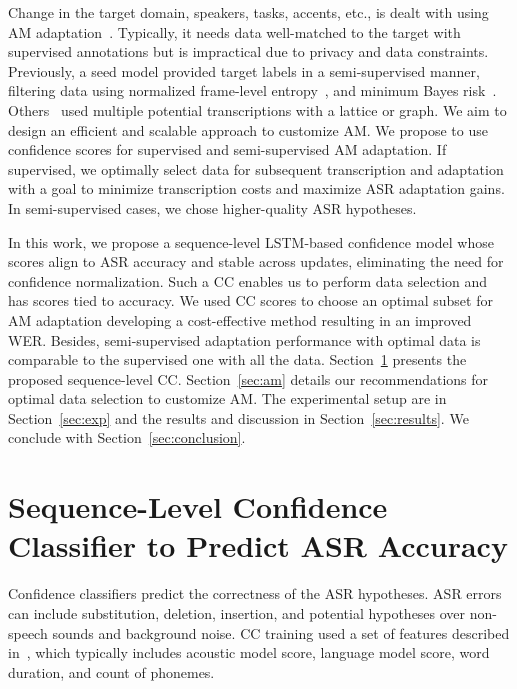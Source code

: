 \documentclass[a4paper]{article}
\begin{document}
Change in the target domain, speakers, tasks, accents, etc., is dealt with using AM adaptation~\cite{Bell2020}. Typically, it needs data well-matched to the target with supervised annotations but is impractical due to privacy and data constraints. Previously, a seed model provided target labels in a semi-supervised manner, filtering data using normalized frame-level entropy~\cite{Liu2007}, and minimum Bayes risk~\cite{Walker2017}. Others~\cite{Manohar2018, Klejch2019} used multiple potential transcriptions with a lattice or graph. We aim to design an efficient and scalable approach to customize AM. We propose to use confidence scores for supervised and semi-supervised AM adaptation. If supervised, we optimally select data for subsequent transcription and adaptation with a goal to minimize transcription costs and maximize ASR adaptation gains. In semi-supervised cases, we chose higher-quality ASR hypotheses.

In this work, we propose a sequence-level LSTM-based confidence model whose scores align to ASR accuracy and stable across updates, eliminating the need for confidence normalization. Such a CC enables us to perform data selection and has scores tied to accuracy. We used CC scores to choose an optimal subset for AM adaptation developing a cost-effective method resulting in an improved WER. Besides, semi-supervised adaptation performance with optimal data is comparable to the supervised one with all the data. Section~\ref{sec:cc} presents the proposed sequence-level CC. Section~\ref{sec:am} details our recommendations for optimal data selection to customize AM. The experimental setup are in Section~\ref{sec:exp} and the results and discussion in Section~\ref{sec:results}. We conclude with Section~\ref{sec:conclusion}.
\section{Sequence-Level Confidence Classifier to Predict ASR Accuracy}
\label{sec:cc}
Confidence classifiers predict the correctness of the ASR hypotheses. ASR errors can include substitution, deletion, insertion, and potential hypotheses over non-speech sounds and background noise. CC training used a set of features described in~\cite{Huang2013a}, which typically includes acoustic model score, language model score, word duration, and count of phonemes. 
\end{document}
